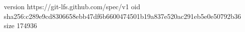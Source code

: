 version https://git-lfs.github.com/spec/v1
oid sha256:c289e9cd8306658ebb47df6b6600474501b19a837e520ac291eb5e0e50792b36
size 174936
